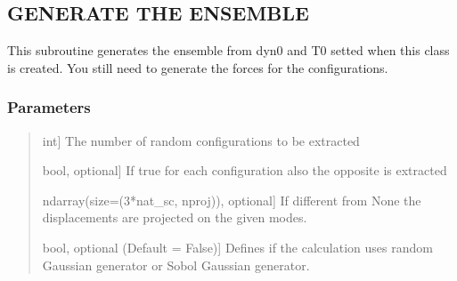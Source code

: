 \documentclass[a4paper,11pt,english]{sphinxmanual}
\begin{document}
\begin{fulllineitems}
\begin{fulllineitems}
\begin{itemize}
\begin{description}
\end{description}

\end{itemize}

\end{fulllineitems}


\begin{fulllineitems}
\label{\detokenize{apireference:sscha.Ensemble.Ensemble.generate}}
\pysigstartsignatures
{}
\pysigstopsignatures

\subsection{GENERATE THE ENSEMBLE}
\label{\detokenize{apireference:generate-the-ensemble}}
\sphinxAtStartPar
This subroutine generates the ensemble from dyn0 and T0 setted when this
class is created.
You still need to generate the forces for the configurations.


\subsubsection{Parameters}
\label{\detokenize{apireference:id1}}\begin{quote}
\begin{description}
\sphinxlineitem{N}{[}int{]}
\sphinxAtStartPar
The number of random configurations to be extracted

\sphinxlineitem{evenodd}{[}bool, optional{]}
\sphinxAtStartPar
If true for each configuration also the opposite is extracted

\sphinxlineitem{project\_on\_modes}{[}ndarray(size=(3*nat\_sc, nproj)), optional{]}
\sphinxAtStartPar
If different from None the displacements are projected on the
given modes.

\sphinxlineitem{sobol}{[}bool, optional (Default = False){]}
\sphinxAtStartPar
Defines if the calculation uses random Gaussian generator or Sobol Gaussian generator.


\end{description}
\end{quote}
\end{fulllineitems}
\end{fulllineitems}
\end{document}

